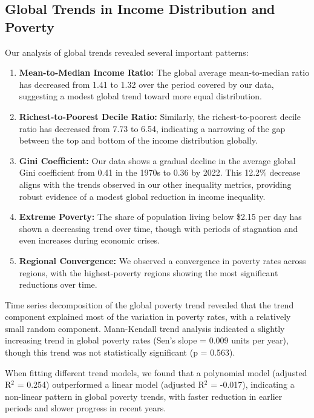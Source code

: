 \documentclass[12pt,a4paper]{article}
\begin{document}
\subsection{Global Trends in Income Distribution and Poverty}
Our analysis of global trends revealed several important patterns:
\begin{enumerate}
    \item \textbf{Mean-to-Median Income Ratio:} The global average mean-to-median ratio has decreased from 1.41 to 1.32 over the period covered by our data, suggesting a modest global trend toward more equal distribution.
    \item \textbf{Richest-to-Poorest Decile Ratio:} Similarly, the richest-to-poorest decile ratio has decreased from 7.73 to 6.54, indicating a narrowing of the gap between the top and bottom of the income distribution globally.
    \item \textbf{Gini Coefficient:} Our data shows a gradual decline in the average global Gini coefficient from 0.41 in the 1970s to 0.36 by 2022. This 12.2\% decrease aligns with the trends observed in our other inequality metrics, providing robust evidence of a modest global reduction in income inequality.
    \item \textbf{Extreme Poverty:} The share of population living below \$2.15 per day has shown a decreasing trend over time, though with periods of stagnation and even increases during economic crises.
    \item \textbf{Regional Convergence:} We observed a convergence in poverty rates across regions, with the highest-poverty regions showing the most significant reductions over time.
\end{enumerate}

Time series decomposition of the global poverty trend revealed that the trend component explained most of the variation in poverty rates, with a relatively small random component. Mann-Kendall trend analysis indicated a slightly increasing trend in global poverty rates (Sen's slope = 0.009 units per year), though this trend was not statistically significant (p = 0.563).

When fitting different trend models, we found that a polynomial model (adjusted R$^2$ = 0.254) outperformed a linear model (adjusted R$^2$ = -0.017), indicating a non-linear pattern in global poverty trends, with faster reduction in earlier periods and slower progress in recent years.
\end{document}
